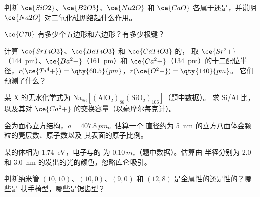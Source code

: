 \begin{exercise}[$\star$]\label{exo:b3:inorganic-materials:3}
判断 $\ce{SiO2}$、$\ce{B2O3}$、$\ce{Na2O}$ 和 $\ce{CaO}$ 各属于还是，并说明
$\ce{Na2O}$ 对二氧化硅网络起什么作用。
\end{exercise}

\begin{exercise}[$\star$]\label{exo:b3:inorganic-materials:4}
$\ce{C70}$ 有多少个五边形和六边形？有多少根键？
\end{exercise}

\begin{exercise}[$\star\star$]\label{exo:b3:inorganic-materials:5}
计算 $\ce{SrTiO3}$、$\ce{BaTiO3}$ 和 $\ce{CaTiO3}$ 的，
取 $\ce{Sr^2+}$（\qty{144}{pm}）、$\ce{Ba^2+}$（\qty{161}{pm}）和 $\ce{Ca^2+}$（\qty{134}{pm}）的十二配位半径，$r(\ce{Ti^4+}) = \qty{60.5}{pm}$，$r(\ce{O^2-}) = \qty{140}{pm}$。
它们预测了什么？
\end{exercise}

\begin{exercise}[$\star\star$]\label{exo:b3:inorganic-materials:6}
某 X 的无水化学式为 $\mathrm{Na_{86}[(AlO_2)_{86}(SiO_2)_{106}]}$（题中数据）。
求 Si/Al 比，以及其对 $\ce{Ca^2+}$ 的交换容量（以毫摩尔每克计）。
\end{exercise}

\begin{exercise}[$\star\star$]\label{exo:b3:inorganic-materials:7}
金为面心立方结构，$a = \qty{407.8}{pm}$。估算一个
直径约为 \qty{5}{nm} 的立方八面体金颗粒的壳层数、原子数以及
其表面的原子比例。
\end{exercise}

\begin{exercise}[$\star\star$]\label{exo:b3:inorganic-materials:8}
某的体相为 \qty{1.74}{eV}，电子与的
为 $0.10\,m_e$（题中数据）。估算由
半径分别为 2.0 和 \qty{3.0}{nm} 的发出的光的颜色，忽略库仑吸引。
\end{exercise}

\begin{exercise}[$\star\star$]\label{exo:b3:inorganic-materials:9}
判断纳米管 $(10, 10)$、$(10, 0)$、$(9, 0)$ 和 $(12, 8)$ 是金属性的还是性的？哪些是
扶手椅型，哪些是锯齿型？
\end{exercise}

